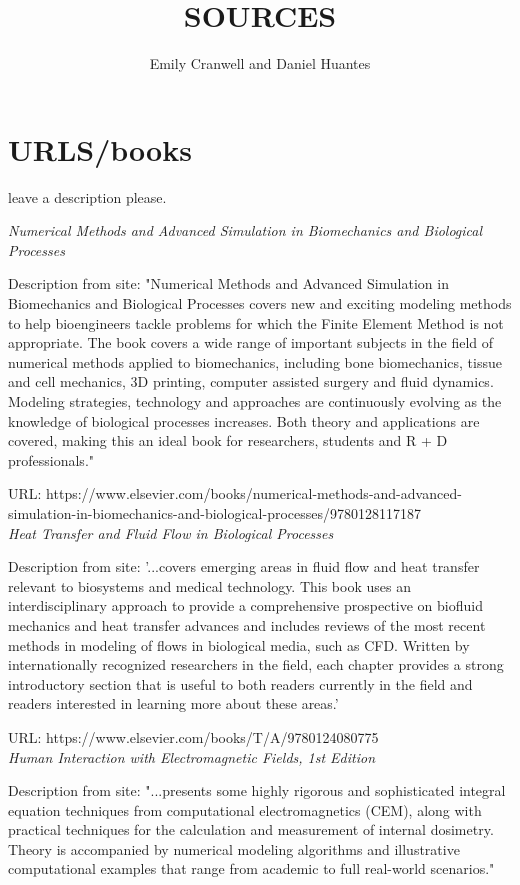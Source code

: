 \documentclass[12pt]{article}
\begin{document}
\title{SOURCES}
\author{Emily Cranwell and Daniel Huantes}
\maketitle
\section{URLS/books}
leave a description please.

\textit{Numerical Methods and Advanced Simulation in Biomechanics and Biological Processes}

Description from site: "Numerical Methods and Advanced Simulation in Biomechanics and Biological Processes covers new and exciting modeling methods to help bioengineers tackle problems for which the Finite Element Method is not appropriate. The book covers a wide range of important subjects in the field of numerical methods applied to biomechanics, including bone biomechanics, tissue and cell mechanics, 3D printing, computer assisted surgery and fluid dynamics. Modeling strategies, technology and approaches are continuously evolving as the knowledge of biological processes increases. Both theory and applications are covered, making this an ideal book for researchers, students and R + D professionals."

URL: https://www.elsevier.com/books/numerical-methods-and-advanced-simulation-in-biomechanics-and-biological-processes/9780128117187
\\

\textit{Heat Transfer and Fluid Flow in Biological Processes}

Description from site: '...covers emerging areas in fluid flow and heat transfer relevant to biosystems and medical technology. This book uses an interdisciplinary approach to provide a comprehensive prospective on biofluid mechanics and heat transfer advances and includes reviews of the most recent methods in modeling of flows in biological media, such as CFD. Written by internationally recognized researchers in the field, each chapter provides a strong introductory section that is useful to both readers currently in the field and readers interested in learning more about these areas.'

URL: https://www.elsevier.com/books/T/A/9780124080775
\\

\textit{Human Interaction with Electromagnetic Fields, 1st Edition}

Description from site: "...presents some highly rigorous and sophisticated integral equation techniques from computational electromagnetics (CEM), along with practical techniques for the calculation and measurement of internal dosimetry. Theory is accompanied by numerical modeling algorithms and illustrative computational examples that range from academic to full real-world scenarios."
\end{document}
